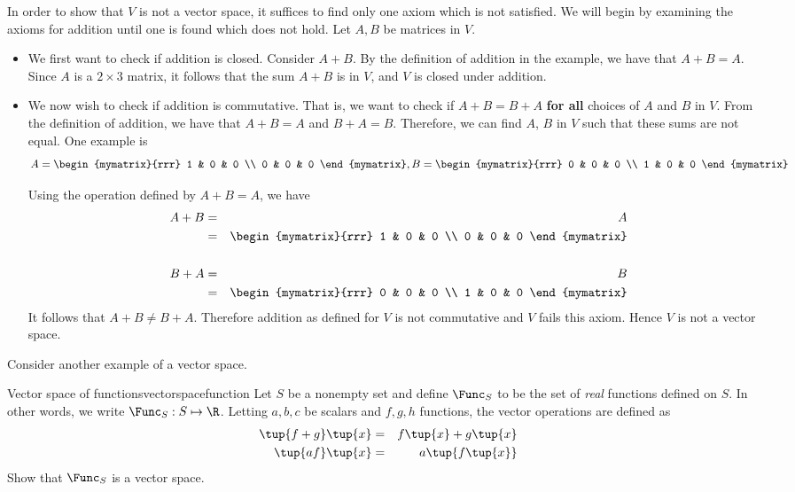 \begin{solution}
In order to show that $V$ is not a vector space, it suffices to find only one axiom which is not satisfied. We will begin by examining the axioms for addition until one is found which does not hold. Let $A,B$ be matrices in $V$. 

\begin{itemize}
\item
We first want to check if addition is closed. Consider $A+B$. By the definition of addition in the example, we have that $A+B = A$. Since $A$ is a $2 \times 3$ matrix, it follows that the sum $A+B$ is in $V$, and $V$ is closed under addition. 

\item
We now wish to check if addition is commutative. That is, we want to check if $A + B = B + A$ \textbf{for all} choices of $A$ and $B$ in $V$. From the definition of addition, we have that $A + B = A$ and $B + A = B$. Therefore, we can find $A$, $B$ in $V$ such that these sums are not equal. One example is 
\[
A = \begin{mymatrix}{rrr}
1 & 0 & 0 \\
0 & 0 & 0 
\end{mymatrix}, B = \begin{mymatrix}{rrr}
0 & 0 & 0 \\
1 & 0 & 0 
\end{mymatrix}
\]

Using the operation defined by $A+B=A$, we have 
\begin{eqnarray*}
A+B &=& A \\
&=& \begin{mymatrix}{rrr}
1 & 0 & 0 \\
0 & 0 & 0 
\end{mymatrix} \\
\\
B+A &=& B \\
&=& \begin{mymatrix}{rrr}
0 & 0 & 0 \\
1 & 0 & 0 
\end{mymatrix}
\end{eqnarray*}
It follows that $A+B \neq B+A$. Therefore addition as defined for $V$ is not commutative and $V$ fails this axiom. Hence $V$ is not a vector space.
\end{itemize}
\end{solution}

Consider another example of a vector space. 

\begin{example}{Vector space of functions}{vectorspacefunction}
Let $S$ be a nonempty set and define $\Func_S$ to be the set of \textit{real} functions
defined on $S$. In other words, we write $\Func_S: S \mapsto \R$. Letting $a,b,c$ be scalars and $f,g,h$ functions, the
vector operations are defined as
\begin{eqnarray*}
\tup{f+g} \tup{x}  &=&f\tup{x} +g\tup{
x}  \\
\tup{af} \tup{x}  &=&a\tup{f\tup{x} }
\end{eqnarray*}
Show that $\Func_S$ is a vector space. 
\end{example}

